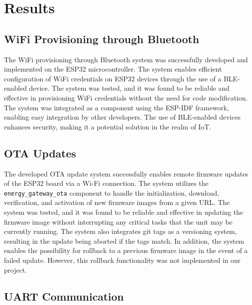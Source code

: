 \section{Results}\label{sec:results}

\subsection{WiFi Provisioning through Bluetooth}

The WiFi provisioning through Bluetooth system was successfully developed and implemented on the ESP32 microcontroller. The system enables efficient configuration of WiFi credentials on ESP32 devices through the use of a BLE-enabled device. The system was tested, and it was found to be reliable and effective in provisioning WiFi credentials without the need for code modification. The system was integrated as a component using the ESP-IDF framework, enabling easy integration by other developers. The use of BLE-enabled devices enhances security, making it a potential solution in the realm of IoT.

\subsection{OTA Updates}

The developed OTA update system successfully enables remote firmware updates of the ESP32 board via a Wi-Fi connection. The system utilizes the \texttt{energy\_gateway\_ota} component to handle the initialization, download, verification, and activation of new firmware images from a given URL. The system was tested, and it was found to be reliable and effective in updating the firmware image without interrupting any critical tasks that the unit may be currently running. The system also integrates git tags as a versioning system, resulting in the update being aborted if the tags match. In addition, the system enables the possibility for rollback to a previous firmware image in the event of a failed update. However, this rollback functionality was not implemented in our project.

\subsection{UART Communication}

